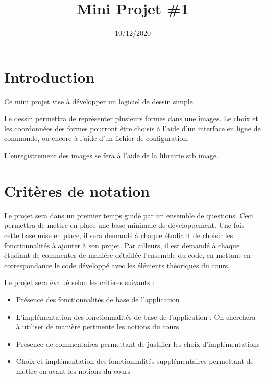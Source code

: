\documentclass[
	12pt, %
]{fphw}
\title{Mini Projet \#1} %
\author{} %
\institute{ISEN Marseille} %
\date{10/12/2020} %
\begin{document}
\maketitle %


\section*{Introduction}

Ce mini projet vise à développer un logiciel de dessin simple. 

Le dessin permettra de représenter plusieurs formes dans une images. Le choix et les coordonnées des formes pourront être choisis à l'aide d'un interface en ligne de commande, ou encore à l'aide d'un fichier de configuration.

L'enregistrement des images se fera à l'aide de la librairie stb image.


\section*{Critères de notation}

Le projet sera dans un premier temps guidé par un ensemble de questions. Ceci permettra de mettre en place une base minimale de développement.
Une fois cette base mise en place, il sera demandé à chaque étudiant de choisir les fonctionnalités à ajouter à son projet. Par ailleurs, il est demandé à chaque étudiant de commenter de manière détaillée l'ensemble du code, en mettant en correspondance le code développé avec les éléments théoriques du cours.


Le projet sera évalué selon les critères suivants :
\begin{itemize}
	\item Présence des fonctionnalités de base de l'application
	\item L'implémentation des fonctionnalités de base de l'application : On cherchera à utiliser de manière pertinente les notions du cours
	\item Présence de commentaires permettant de justifier les choix d'implémentations
	\item Choix et implémentation des fonctionnalités supplémentaires permettant de mettre en avant les notions du cours
\end{itemize}
\end{document}
